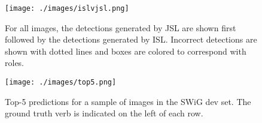 \documentclass[runningheads]{llncs}
\begin{document}
\begin{figure}[h!]
\centering
\vspace{2em}
\texttt{[image: ./images/islvjsl.png]}
\caption{For all images, the detections generated by JSL are shown first followed by the detections generated by ISL. Incorrect detections are shown with dotted lines and boxes are colored to correspond with roles. 
}

\label{fig:islvjsl}
\end{figure}

\begin{figure}[h!]
\centering
\texttt{[image: ./images/top5.png]}
\caption{Top-5 predictions for a sample of images in the SWiG dev set. The ground truth verb is indicated on the left of each row.}

\label{fig:top5}
\end{figure}

 

\clearpage
\end{document}
